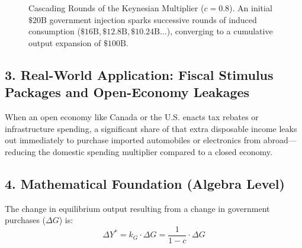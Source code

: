 \documentclass[11pt,letterpaper]{article}
\begin{document}
\begin{figure}[htbp]
\centering
{}
\caption{Cascading Rounds of the Keynesian Multiplier ($c = 0.8$). An initial $\$20\text{B}$ government injection sparks successive rounds of induced consumption ($\$16\text{B}, \$12.8\text{B}, \$10.24\text{B}\dots$), converging to a cumulative output expansion of $\$100\text{B}$.}
\label{fig:multiplier_rounds}
\end{figure}

\subsection*{3. Real-World Application: Fiscal Stimulus Packages and Open-Economy Leakages}
When an open economy like Canada or the U.S. enacts tax rebates or infrastructure spending, a significant share of that extra disposable income leaks out immediately to purchase imported automobiles or electronics from abroad—reducing the domestic spending multiplier compared to a closed economy.

\subsection*{4. Mathematical Foundation (Algebra Level)}
The change in equilibrium output resulting from a change in government purchases ($\Delta G$) is:
\begin{equation}
\Delta Y^* = k_G \cdot \Delta G = \frac{1}{1 - c} \cdot \Delta G
\end{equation}
\end{document}
